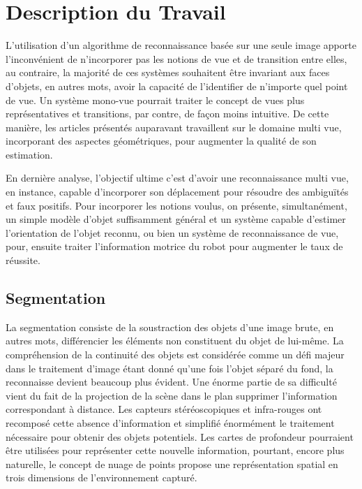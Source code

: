 
\chapter{Description du Travail}


L'utilisation d'un algorithme de reconnaissance basée sur une seule image apporte l'inconvénient de
n'incorporer pas les notions de vue et de transition entre elles, au contraire, la majorité de ces systèmes souhaitent être invariant aux faces d'objets, en autres mots, avoir la capacité de l'identifier de n'importe quel point de vue. Un système mono-vue pourrait traiter le concept de vues plus représentatives et transitions, par contre, de façon moins intuitive. De cette manière, les articles présentés auparavant travaillent sur le domaine multi vue, incorporant des aspectes géométriques, pour augmenter la qualité de son estimation.

En dernière analyse, l'objectif ultime c'est d'avoir une reconnaissance multi vue, en instance, capable d'incorporer son déplacement pour résoudre des ambiguïtés et faux positifs. Pour incorporer les notions voulus, on présente, simultanément, un simple modèle d’objet suffisamment général et un système capable d'estimer l'orientation de l'objet reconnu, ou bien un système de reconnaissance de vue, pour, ensuite traiter l’information motrice du robot pour augmenter le taux de réussite.

\section{Segmentation}

La segmentation consiste de la soustraction des objets d'une image brute, en autres mots, différencier les éléments non constituent du objet de lui-même. La compréhension de la continuité des objets est considérée comme un défi majeur dans le traitement d'image étant donné qu'une fois l'objet séparé du fond, la reconnaisse devient beaucoup plus évident. Une énorme partie de sa difficulté vient du fait de la projection de la scène dans le plan supprimer l'information
correspondant à distance. Les capteurs stéréoscopiques et infra-rouges ont recomposé cette absence d'information et simplifié énormément le traitement nécessaire pour obtenir des objets potentiels. Les cartes de profondeur pourraient être utilisées pour représenter cette nouvelle information, pourtant, encore plus naturelle, le concept de nuage de points propose une représentation spatial en trois dimensions de l'environnement capturé.

